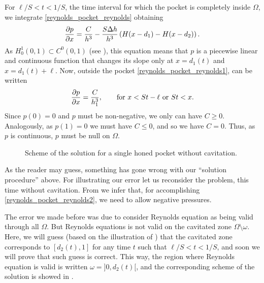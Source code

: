 For $\ell/S<t<1/S$, the time interval for which the pocket is completely inside $\Omega$, we integrate \eqref{reynolds_pocket_reynolds} obtaining
\begin{equation}
\parder{p}{x}=\frac{C}{h^3}-\frac{S\Delta h}{h^3}\left(H(x-d_1)-H(x-d_2)\right).\label{eq:reynolds_pocket_reynolds1}
\end{equation}
As $H_0^1(0,1)\subset C^0(0,1)$ (see ), this equation means that $p$ is a piecewise linear and continuous function that changes its slope only at $x=d_1(t)$ and $x=d_1(t)+\ell$. Now, outside the pocket \eqref{reynolds_pocket_reynolds1}, can be written
\begin{equation}
\parder{p}{x}=\frac{C}{h_1^3},\qquad\text{for } x<St-\ell\text{ or }St<x.\label{eq:reynolds_pocket_reynolds2}
\end{equation}
Since $p(0)=0$ and $p$ must be non-negative, we only can have $C\geq 0$. Analogously, as $p(1)=0$ we must have $C\leq 0$, and so we have $C=0$. Thus, as $p$ is continuous, $p$ must be null on $\Omega$.
\begin{figure}[hb]
 \centering 
 \def\svgwidth{\textwidth}
\caption{Scheme of the solution for a single honed pocket without cavitation.}\label{fig:pressure_pocket_nocav}
\end{figure}

As the reader may guess, something has gone wrong with our ``solution procedure'' above. For illustrating our error let us reconsider the problem, this time without cavitation. From  we infer that, for accomplishing \eqref{reynolds_pocket_reynolds2}, we need to allow negative pressures.

The error we made before was due to consider Reynolds equation as being valid through all $\Omega$. But Reynolds equations is not valid on the cavitated zone $\Omega\setminus\omega$. Here, we will guess (based on the illustration of ) that the cavitated zone corresponds to $[d_2(t),1]$ for any time $t$ such that $\ell/S<t<1/S$, and soon we will prove that such guess is correct. This way, the region where Reynolds equation is valid is written $\omega={}]0,d_2(t)[$, and the corresponding scheme of the solution is showed in .

